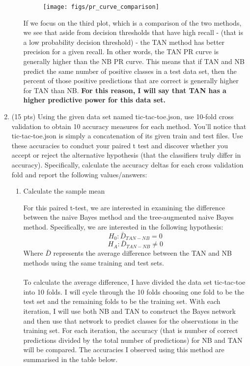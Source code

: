 \documentclass{article}
\newenvironment{soln}{
	\leavevmode\color{blue}\ignorespaces
}{}
\begin{document}
\begin{enumerate}
\begin{enumerate}
\begin{soln}
\begin{figure}[H]
\centering
\texttt{[image: figs/pr\_curve\_comparison]}
\label{fig:pr_curve_comparison}
\end{figure}

If we focus on the third plot, which is a comparison of the two methods, we see that aside from decision thresholds that have high recall - (that is a low probability decision threshold) - the TAN method has better precision for a given recall. In other words, the TAN PR curve is generally higher than the NB PR curve. This means that if TAN and NB predict the same number of positive classes in a test data set, then the percent of those positive predictions that are correct is generally higher for TAN than NB. \textbf{For this reason, I will say that TAN has a higher predictive power for this data set.}

\end{soln}

\end{enumerate}
\pagebreak


\item (15 pts) Using the given data set named tic-tac-toe.json, use 10-fold cross validation to obtain 10 accuracy measures for each method. You’ll notice that tic-tac-toe.json is simply a concatenation of its given train and test files. Use these accuracies to conduct your paired t test and discover whether you accept or reject the alternative hypothesis (that the classifiers truly differ in accuracy). Specifically, calculate the accuracy deltas for each cross validation fold and report the following values/answers:
\begin{enumerate}
\item Calculate the sample mean \\ 
\begin{soln}
For this paired t-test, we are interested in examining the difference between the naive Bayes method and the tree-augmented naive Bayes method. Specifically, we are interested in the following hypothesis:
\[H_0: \bar{D}_{TAN - NB} = 0\]
\[H_A: \bar{D}_{TAN - NB} \neq 0\]
Where $\bar{D}$ represents the average difference between the TAN and NB methods using the same training and test sets. \\ \\
To calculate the average difference, I have divided the data set tic-tac-toe into 10 folds. I will cycle through the 10 folds choosing one fold to be the test set and the remaining folds to be the training set. With each iteration, I will use both NB and TAN to construct the Bayes network and then use that network to predict classes for the observations in the training set. For each iteration, the accuracy (that is number of correct predictions divided by the total number of predictions) for NB and TAN will be compared. The accuracies I observed using this method are summarised in the table below. \\


\end{soln}
\end{enumerate}
\end{enumerate}
\end{document}
